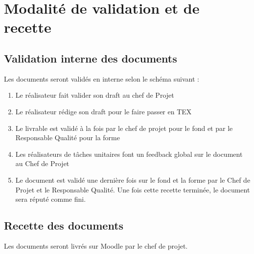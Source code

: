\section{Modalité de validation et de recette}

\subsection{Validation interne des documents}

Les documents seront validés en interne selon le schéma suivant : 
\begin{enumerate}
\item Le réalisateur fait valider son draft au chef de Projet
\item Le réalisateur rédige son draft pour le faire passer en TEX
\item Le livrable est validé à la fois par le chef de projet pour le fond et par le Responsable Qualité pour la forme
\item Les réalisateurs de tâches unitaires font un feedback global sur le document au Chef de Projet
\item Le document est validé une dernière fois sur le fond et la forme par le Chef de Projet et le Responsable Qualité. Une fois cette recette terminée, le document sera réputé comme fini.
\end{enumerate} 

\subsection{Recette des documents}

Les documents seront livrés sur Moodle par le chef de projet. 

